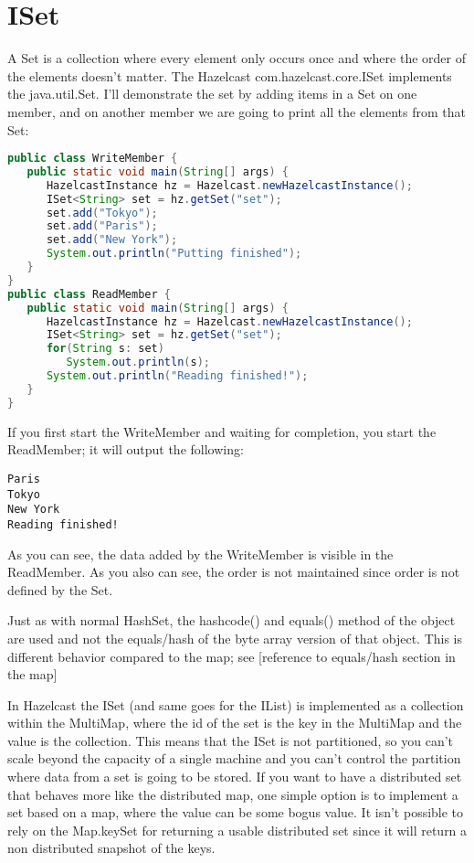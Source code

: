 \section{ISet}
A Set is a collection where every element only occurs once and where the order of the elements doesn't matter. The Hazelcast com.hazelcast.core.ISet implements the java.util.Set. I'll demonstrate the set by adding items in a Set on one member, and on another member we are going to print all the elements from that Set:
\begin{lstlisting}[language=java]
public class WriteMember {
   public static void main(String[] args) {
      HazelcastInstance hz = Hazelcast.newHazelcastInstance();
      ISet<String> set = hz.getSet("set");
      set.add("Tokyo");
      set.add("Paris");
      set.add("New York");
      System.out.println("Putting finished");
   }
}
public class ReadMember {
   public static void main(String[] args) {
      HazelcastInstance hz = Hazelcast.newHazelcastInstance();
      ISet<String> set = hz.getSet("set");
      for(String s: set) 
         System.out.println(s);
      System.out.println("Reading finished!");
   }
}
\end{lstlisting}
If you first start the WriteMember and waiting for completion, you start the ReadMember; it will output the following:
\begin{lstlisting}
Paris
Tokyo
New York
Reading finished!	
\end{lstlisting}
As you can see, the data added by the WriteMember is visible in the ReadMember. As you also can see, the order is not maintained since order is not defined by the Set.

Just as with normal HashSet, the hashcode() and equals() method of the object are used and not the equals/hash of the byte array version of that object. This is different behavior compared to the map; see [reference to equals/hash section in the map]

In Hazelcast the ISet (and same goes for the IList) is implemented as a collection within the MultiMap, where the id of the set is the key in the MultiMap and the value is the collection. This means that the ISet is not partitioned, so you can't scale beyond the capacity of a single machine and you can't control the partition where data from a set is going to be stored. If you want to have a distributed set that behaves more like the distributed map, one simple option is to implement a set based on a map, where the value can be some bogus value. It isn't possible to rely on the Map.keySet for returning a usable distributed set since it will return a non distributed snapshot of the keys.

